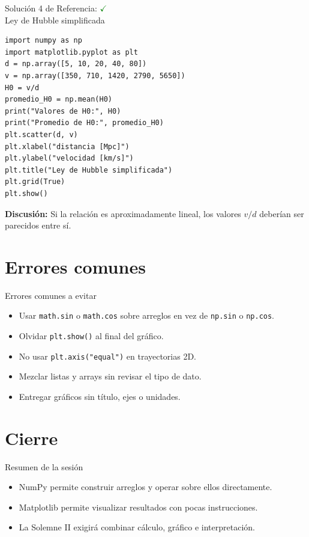 \documentclass[10pt]{beamer}
\begin{document}
\begin{solutionblock}
\begin{frame}[fragile]{Solución 4 de Referencia: \hfill \textcolor{green}{$\checkmark$} \\ Ley de Hubble simplificada}
\begin{verbatim}
import numpy as np
import matplotlib.pyplot as plt
d = np.array([5, 10, 20, 40, 80])
v = np.array([350, 710, 1420, 2790, 5650])
H0 = v/d
promedio_H0 = np.mean(H0)
print("Valores de H0:", H0)
print("Promedio de H0:", promedio_H0)
plt.scatter(d, v)
plt.xlabel("distancia [Mpc]")
plt.ylabel("velocidad [km/s]")
plt.title("Ley de Hubble simplificada")
plt.grid(True)
plt.show()
\end{verbatim}
\textbf{Discusión:} Si la relación es aproximadamente lineal, los valores \(v/d\) deberían ser parecidos entre sí.
\end{frame}
\end{solutionblock}

\section{Errores comunes}
\begin{frame}{Errores comunes a evitar}
\begin{itemize}
  \item Usar \texttt{math.sin} o \texttt{math.cos} sobre arreglos en vez de \texttt{np.sin} o \texttt{np.cos}.
  \item Olvidar \texttt{plt.show()} al final del gráfico.
  \item No usar \texttt{plt.axis("equal")} en trayectorias 2D.
  \item Mezclar listas y arrays sin revisar el tipo de dato.
  \item Entregar gráficos sin título, ejes o unidades.
\end{itemize}
\end{frame}

\section{Cierre}
\begin{frame}{Resumen de la sesión}
\begin{itemize}
  \item NumPy permite construir arreglos y operar sobre ellos directamente.
  \item Matplotlib permite visualizar resultados con pocas instrucciones.
  \item La Solemne II exigirá combinar cálculo, gráfico e interpretación.
\end{itemize}
\end{frame}
\end{document}
